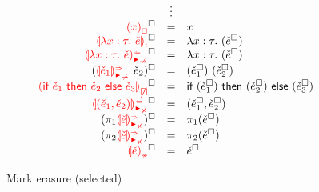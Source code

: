 \begin{figure}[htbp]
\[\begin{array}{rcl}
    & \vdots & \\
    \erasesToRow{\ECFree{x}}{x} \\
    \erasesToRow{\ECLamInconAsc{x}{\TMV}{\ECMV}}{\ELam{x}{\TMV}{(\erase{\ECMV})}} \\
    \erasesToRow{\ECLamAnaNonMatchedArrow{x}{\TMV}{\ECMV}}{\ECLam{x}{\TMV}{(\erase{\ECMV})}} \\
    \erasesToRow{(\ECApSynNonMatchedArrow{\ECMV_1}{\ECMV_2})}{\ECAp{(\erase{\ECMV_1})}{(\erase{\ECMV_2})}} \\
    \erasesToRow{\ECInconBr{\ECMV_1}{\ECMV_2}{\ECMV_3}}{\EIf{(\erase{\ECMV_1})}{(\erase{\ECMV_2})}{(\erase{\ECMV_3})}} \\
    \erasesToRow{\ECPairAnaNonMatchedProd{\ECMV_1}{\ECMV_2}}{\ECPair{\erase{\ECMV_1}}{\erase{\ECMV_2}}} \\
    \erasesToRow{(\ECProjLSynNonMatchedProd{\ECMV})}{\ECProjL{(\erase{\ECMV})}} \\
    \erasesToRow{(\ECProjRSynNonMatchedProd{\ECMV})}{\ECProjR{(\erase{\ECMV})}} \\
    \erasesToRow{\ECInconType{\ECMV}}{\erase{\ECMV}}
  \end{array}\]

  \caption{Mark erasure (selected)}
  \label{fig:calculus-mark-erasure}
\end{figure}
